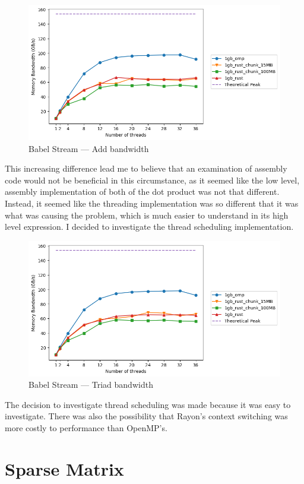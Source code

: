 \begin{figure}[h]
\centering
\includegraphics[width=.9\linewidth]{figs/babel/Add.png}
\caption{Babel Stream --- Add bandwidth}\label{fig:babel-add}
\end{figure}

This increasing difference lead me to believe that an examination of assembly code would not be beneficial in this circumstance, as it seemed like the low level, assembly implementation of both of the dot product was not that different. Instead, it seemed like the threading implementation was so different that it was what was causing the problem, which is much easier to understand in its high level expression. I decided to investigate the thread scheduling implementation.

\begin{figure}[h]
\centering
\includegraphics[width=.9\linewidth]{figs/babel/Triad.png}
\caption{Babel Stream --- Triad bandwidth}\label{fig:babel-triad}
\end{figure}

The decision to investigate thread scheduling was made because it was easy to investigate. There was also the possibility that Rayon's context switching was more costly to performance than OpenMP's.
\section{Sparse Matrix}\label{sec:res-sparse}
